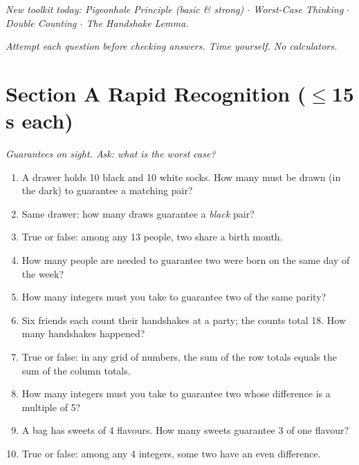 \documentclass[11pt,a4paper]{article}
\begin{document}
\noindent\textit{New toolkit today: Pigeonhole Principle (basic \& strong) $\cdot$ Worst-Case Thinking $\cdot$ Double Counting $\cdot$ The Handshake Lemma.}

\vspace{2pt}
\noindent\textit{Attempt each question before checking answers. Time yourself. No calculators.}

\section*{Section A \quad Rapid Recognition \hfill{\normalfont\small($\leq$15 s each)}}

\noindent\textit{Guarantees on sight. Ask: what is the worst case?}

\begin{enumerate}

\item A drawer holds 10 black and 10 white socks. How many must be drawn (in the dark) to guarantee a matching pair?

\item Same drawer: how many draws guarantee a \emph{black} pair?

\item True or false: among any 13 people, two share a birth month.

\item How many people are needed to guarantee two were born on the same day of the week?

\item How many integers must you take to guarantee two of the same parity?

\item Six friends each count their handshakes at a party; the counts total 18. How many handshakes happened?

\item True or false: in any grid of numbers, the sum of the row totals equals the sum of the column totals.

\item How many integers must you take to guarantee two whose difference is a multiple of 5?

\item A bag has sweets of 4 flavours. How many sweets guarantee 3 of one flavour?

\item True or false: among any 4 integers, some two have an even difference.

\end{enumerate}
\end{document}
